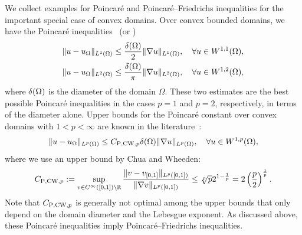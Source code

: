 \documentclass[10pt,a4paper]{article}
\begin{document}
We collect examples for Poincar\'e and Poincar\'e--Friedrichs inequalities for the important special case of convex domains. 
Over convex bounded domains, we have the Poincar\'e inequalities~\cite{Pay_Wei_Poin_conv_60,bebendorf2003note,acosta2004optimal} (or \cite[Lemma~3.24]{ern2021finite}) 
\begin{align}\label{math:acostaduran}
    \| u - u_{\Omega} \|_{L^{1}(\Omega)}
    \leq 
    \frac{{\delta}(\Omega)}{2}
    \| \nabla u \|_{L^{1}(\Omega)}
    ,
    \quad 
    \forall 
    u \in W^{1,1}(\Omega)
    ,
    \\
    \| u - u_{\Omega} \|_{L^{2}(\Omega)} \label{math:bebendorf}
    \leq 
    \frac{{\delta}(\Omega)}{\pi}
    \| \nabla u \|_{L^{2}(\Omega)}
    ,
    \quad 
    \forall 
    u \in W^{1,2}(\Omega)
    ,
\end{align}
where ${\delta}(\Omega)$ is the diameter of the domain $\Omega$.
These two estimates are the best possible Poincar\'e inequalities in the cases $p=1$ and $p=2$, respectively, in terms of the diameter alone. 
Upper bounds for the Poincar\'e constant over convex domains with $1 < p < \infty$ are known in the literature~\cite[Theorem~1.1, Theorem~1.2]{chua2006estimates}:
\begin{align}\label{math:chuawheeden}
    \| u - u_{\Omega} \|_{L^{p}(\Omega)}
    \leq 
    C_{{\rm P},{\rm CW},p}
    {\delta}(\Omega)
    \| \nabla u \|_{L^{p}(\Omega)}
    ,
    \quad 
    \forall 
    u \in W^{1,p}(\Omega)
    ,
\end{align}
where we use an upper bound by Chua and Wheeden:
\begin{align*}
    C_{{\rm P},{\rm CW},p} 
    := 
    \sup\limits_{ v \in C^\infty([0,1]) \setminus {\mathbb R} } 
    \frac{ 
        \| v - v_{[0,1]} \|_{L^{p}([0,1])} 
    }{ 
        \| \nabla v \|_{L^{p}([0,1])} 
    }
    \leq 
    \sqrt[p]{p} 2^{1-\frac 1 p}
    =
    2
    \left( \frac p 2 \right)^{\frac 1 p}
    .
\end{align*} 
Note that $C_{{\rm P},{\rm CW},p}$ is generally not optimal among the upper bounds that only depend on the domain diameter and the Lebesgue exponent.
As discussed above, these Poincar\'e inequalities imply Poincar\'e--Friedrichs inequalities. 
\end{document}
